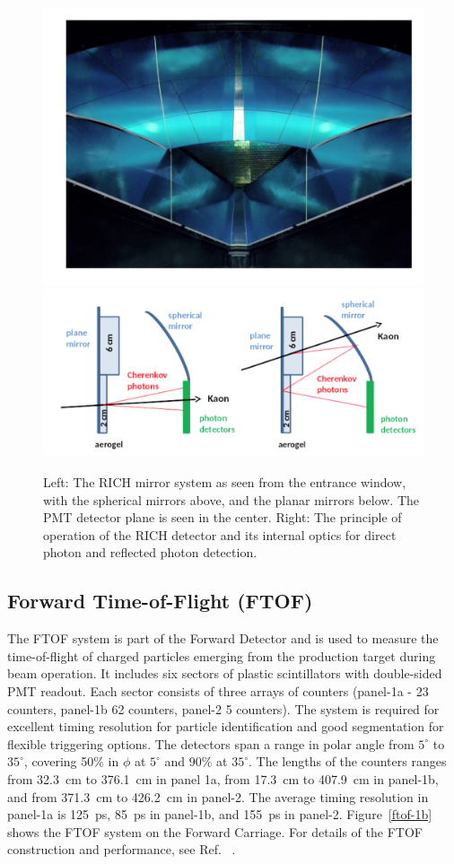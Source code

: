 \documentclass[final,3p,twocolumn]{elsarticle}
\begin{document}
\begin{figure}[htbp!]
\centerline{\includegraphics[width=0.95\columnwidth]{rich-mirrors.png}
\includegraphics[width=1.2\columnwidth]{rich.png}}
\caption{Left: The RICH mirror system as seen from the entrance window, with the spherical mirrors above, and
the planar mirrors below. The PMT detector plane is seen in the center. Right: The principle of operation of the
RICH detector and its internal optics for direct photon and reflected photon detection.}
\label{rich}
\end{figure}

\subsection{Forward Time-of-Flight (FTOF)}
\label{ftof}

The FTOF system is part of the Forward Detector and is used to measure the time-of-flight of charged particles 
emerging from the production target during beam operation. It includes six sectors of plastic scintillators with 
double-sided PMT readout. Each sector consists of three arrays of counters (panel-1a - 23 counters, panel-1b 62
counters, panel-2 5 counters). The system is required for excellent timing resolution for particle identification and
good segmentation for flexible triggering options. The detectors span a range in polar angle from $5^\circ$ to
$35^\circ$, covering 50\% in $\phi$ at $5^\circ$ and 90\% at $35^\circ$. The lengths of the counters ranges from
32.3~cm to 376.1~cm in panel 1a, from 17.3~cm to 407.9~cm in panel-1b, and from 371.3~cm to 426.2~cm in panel-2.
The average timing resolution in panel-1a is 125~ps, 85~ps in panel-1b, and 155~ps in panel-2. Figure~\ref{ftof-1b}
shows the FTOF system on the Forward Carriage. For details of the FTOF construction and performance, see
Ref. ~\cite{FTOF}. 
\end{document}
